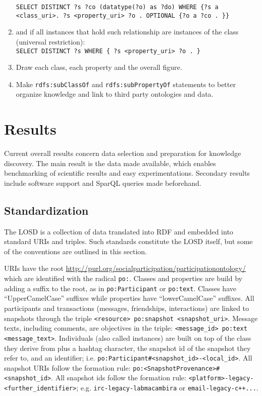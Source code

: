 \documentclass[review]{elsarticle}
\newcommand{\textttt}[1] {\texttt{\footnotesize#1}}
\begin{document}
\begin{enumerate}[leftmargin=0cm]
        \textttt{SELECT DISTINCT ?s ?co  (datatype(?o) as ?do) WHERE \{?s
                a <class\_uri>. ?s <property\_uri> ?o . OPTIONAL \{?o a ?co . \}\}}
    \item and if all instances that hold such relationship are instances of the class
        (universal restriction):\\
        \textttt{SELECT DISTINCT ?s WHERE \{ ?s <property\_uri> ?o . \}}
    \item Draw each class, each property and the overall figure.
    \item Make \textttt{rdfs:subClassOf} and \texttt{rdfs:subPropertyOf}
        statements to better organize knowledge and link to third party
        ontologies and data.
\end{enumerate}
 

\section{Results}
\label{outline}
Current overall results concern data selection and preparation for knowledge discovery.
The main result is the data made available, which enables benchmarking of scientific results
and easy experimentations.
Secondary results include software support and SparQL queries made beforehand.

\subsection{Standardization}
The LOSD is a collection of data translated into RDF and embedded into standard URIs and triples.
Such standards constitute the LOSD itself, but some of the conventions are outlined in this section.

URIs have the root \url{http://purl.org/socialparticipation/participationontology/} which are identified with
the radical \textttt{po:}.
Classes and properties are build by adding a suffix to the root, as in \textttt{po:Participant} or \textttt{po:text}.
Classes have ``UpperCamelCase'' suffixes while properties have ``lowerCamelCase'' suffixes.
All participants and transactions (messages, friendships, interactions) are linked to
snapshots through the triple \textttt{<resource> po:snapshot <snapshot\_uri>}.
Message texts, including comments, are objectives in the triple: \textttt{<message\_id> po:text <message\_text>}.
Individuals (also called instances) are built on top of the class they derive from plus a hashtag character,
the snapshot id of the snapshot they refer to, and an identifier;
i.e. \textttt{po:Participant\#<snapshot\_id>-<local\_id>}.
All snapshot URIs follow the formation rule: \textttt{po:<SnapshotProvenance>\#<snapshot\_id>}.
All snapshot ids follow the formation rule: \textttt{<platform>-legacy-<further\_identifier>}; e.g.
\textttt{irc-legacy-labmacambira} or \textttt{email-legacy-c++...}.
\end{document}
